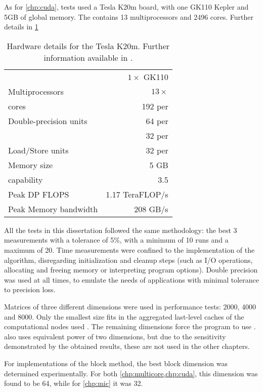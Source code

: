 \documentclass[../thesis]{subfiles}
\begin{document}
	As for \cref{chp:cuda}, tests used a \nvidia Tesla K20m board, with one GK110 Kepler \gpu \cite{NVIDIA:KEPLER} and 5GB of  global memory. The \gpu contains 13 multiprocessors and 2496 \cuda cores. Further details in \cref{tab:k20m}

	\begin{table}[p]
		\begin{center}
			\begin{tabular}{lr}
				\hline
				\gpus & $1\times$ GK110 \\
				Multiprocessors & $13\times$ \smx \\
				\cuda cores & 192 per \smx \\
				Double-precision units & 64 per \smx \\
				\sfus & 32 per \smx \\
				Load/Store units & 32 per \smx \\
				Memory size & 5 GB \\
				\cuda capability & 3.5 \\
				\hline
				Peak DP FLOPS & 1.17 TeraFLOP/s \\
				Peak Memory bandwidth & 208 GB/s \\
				\hline
			\end{tabular}
		\end{center}
		\caption{Hardware details for the \nvidia Tesla K20m. Further information available in \cite{NVIDIA:KEPLER,NVIDIA:TeslaKSeriesOverview}.}
		\label{tab:k20m}
	\end{table}

	All the tests in this dissertation followed the same methodology: the best 3 measurements with a tolerance of 5\%, with a minimum of 10 runs and a maximum of 20. Time measurements were confined to the implementation of the algorithm, disregarding initialization and cleanup steps (such as I/O operations, allocating and freeing memory or interpreting program options). Double precision was used at all times, to emulate the needs of applications with minimal tolerance to precision loss.

	Matrices of three different dimensions were used in performance tests: 2000, 4000 and 8000. Only the smallest size fits in the aggregated last-level caches of the computational nodes used
	. The remaining dimensions force the program to use \dram.  also uses equivalent power of two dimensions, but due to the sensitivity demonstrated by the obtained results, these are not used in the other chapters.

	For implementations of the block method, the best block dimension was determined experimentally. For both \cref{chp:multicore,chp:cuda}, this dimension was found to be 64, while for \cref{chp:mic} it was 32.
\end{document}
